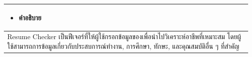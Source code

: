 \begin{table}[H]
\begin{tabular}{|l|}
\begin{minipage}{\linewidth}
  \begin{itemize}
    \item คำอธิบาย
  \end{itemize}
\end{minipage}                                                                                                                                                                                                                       \\ \hline
\begin{minipage}{\linewidth}
  \raggedright
  Resume Checker เป็นฟีเจอร์ที่ให้ผู้ใช้กรอกข้อมูลของเพื่อนำไปวิเคราะห์อาชีพที่เหมาะสม โดยผู้ใช้สามารถการข้อมูลเกี่ยวกับประสบการณ์ทำงาน, การศึกษา, ทักษะ, และคุณสมบัติอื่น ๆ ที่สำคัญ
\end{minipage}
 \\ \hline
\end{tabular}
\end{table}


